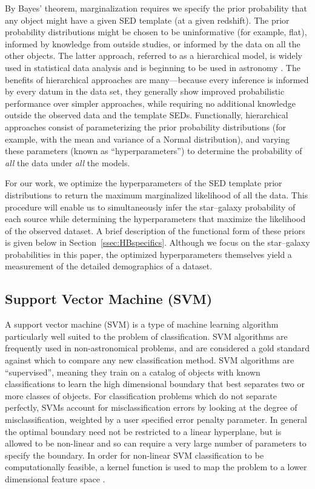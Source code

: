 \documentclass[12pt,preprint]{aastex}
\begin{document}
By Bayes' theorem, marginalization requires we specify the prior
probability that any object might have a given SED template (at a
given redshift).  The prior probability distributions might be chosen
to be uninformative (for example, flat), informed by knowledge from
outside studies, or informed by the data on all the other objects.
The latter approach, referred to as a hierarchical model, is widely
used in statistical data analysis \citep[e.g.,][]{gelman03} and is
beginning to be used in astronomy \citep{mandel09,hogg10b,mandel11,
shu12}.  The benefits of hierarchical
approaches are many---because every inference is informed by every
datum in the data set, they generally show improved probabilistic
performance over simpler approaches, while requiring no additional
knowledge outside the observed data and the template SEDs.
Functionally, hierarchical approaches consist of parameterizing the
prior probability distributions (for example, with the mean and
variance of a Normal distribution), and varying these parameters
(known as ``hyperparameters'') to determine the probability
of \emph{all} the data under \emph{all} the models.

For our work, we optimize the hyperparameters of the SED template
prior distributions to return the maximum marginalized likelihood of
all the data.  This procedure will enable us to simultaneously infer
the star--galaxy probability of each source while determining the
hyperparameters that maximize the likelihood of the observed dataset.
A brief description of the functional form of these priors is given
below in Section~\ref{ssec:HBspecifics}.  Although we focus on the
star--galaxy probabilities in this paper, the optimized hyperparameters
themselves yield a measurement of the detailed demographics of a
dataset. 

\subsection{Support Vector Machine (SVM)}
\label{ssec:SVMmethod}

A support vector machine (SVM) is a type of machine learning algorithm
particularly well suited to the problem of classification.  SVM
algorithms are frequently used in non-astronomical problems, and are
considered a gold standard against which to compare any new
classification method.  SVM algorithms are ``supervised'', meaning
they train on a catalog of objects with known classifications to learn
the high dimensional boundary that best separates two or more classes
of objects.  For classification problems which do not separate perfectly, 
SVMs account for misclassification errors by looking at the degree of 
misclassification, weighted by a user specified error penalty parameter.  
In general the optimal boundary need not be restricted to a linear hyperplane, 
but is allowed 
to be non-linear and so can require a very large number of parameters to 
specify the boundary.  In order for non-linear SVM classification to be 
computationally feasible, a kernel function is used to map the problem to a 
lower dimensional feature space \citep{boser92}.
\end{document}
